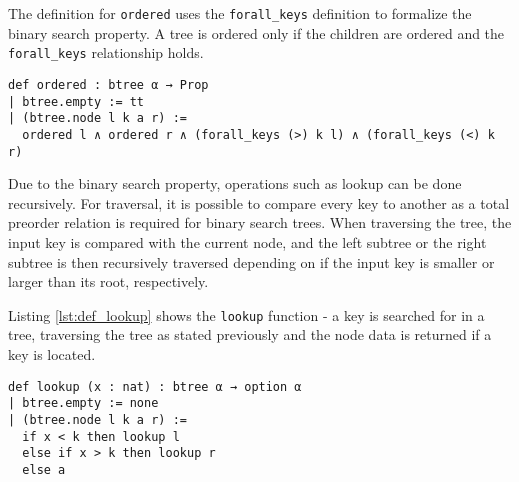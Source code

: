 The definition for \lstinline{ordered} uses the \lstinline{forall_keys} definition to formalize the binary search property. A tree is ordered only if the children are ordered and the \lstinline{forall_keys} relationship holds.

\begin{lstlisting}[caption=\empty]
def ordered : btree α → Prop
| btree.empty := tt
| (btree.node l k a r) :=
  ordered l ∧ ordered r ∧ (forall_keys (>) k l) ∧ (forall_keys (<) k r)
\end{lstlisting}

Due to the binary search property, operations such as lookup can be done recursively. For traversal, it is possible to compare every key to another as a total preorder relation is required for binary search trees. When traversing the tree, the input key is compared with the current node, and the left subtree or the right subtree is then recursively traversed depending on if the input key is smaller or larger than its root, respectively.

Listing \ref{lst:def_lookup} shows the \lstinline{lookup} function - a key is searched for in a tree, traversing the tree as stated previously and the node data is returned if a key is located.

\begin{lstlisting}[caption=\empty, label={lst:def_lookup}]
def lookup (x : nat) : btree α → option α
| btree.empty := none
| (btree.node l k a r) :=
  if x < k then lookup l
  else if x > k then lookup r
  else a
\end{lstlisting}